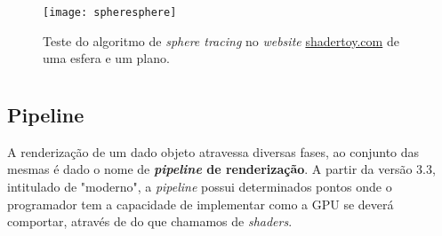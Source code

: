 \begin{figure}[!htbp]
	\centering
	\texttt{[image: spheresphere]}
	\caption[Teste do algoritmo de \textit{sphere tracing}]{Teste do algoritmo de \textit{sphere tracing} no \textit{website} \url{shadertoy.com} de uma esfera e um plano.}
	\label{fig::spheresphere}
\end{figure}


\section{\opengl}
\label{sec::arte:opengl}



\subsection{Pipeline}
A renderização de um dado objeto atravessa diversas fases, ao conjunto das mesmas é dado o nome de \textbf{\textit{pipeline} de renderização}. A partir da versão 3.3, intitulado de "\opengl moderno", a \textit{pipeline} possui determinados pontos onde o programador tem a capacidade de implementar como a \ac{GPU} se deverá comportar, através de do que chamamos de \textit{shaders}.

